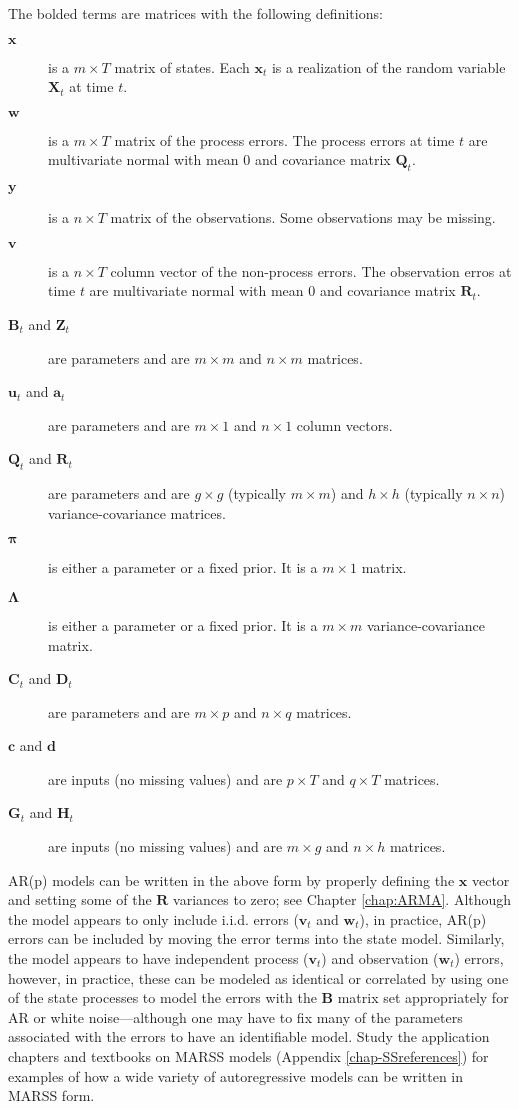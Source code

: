 \documentclass[12pt,]{book}
\begin{document}
The bolded terms are matrices with the following definitions:

\begin{description}
    \item[$\mathbf{x}$] is a $m \times T$ matrix of states.  Each $\mathbf{x}_t$ is a realization of the random variable $\mathbf{X}_t$ at time $t$.
    \item[$\mathbf{w}$] is a $m \times T$ matrix of the process errors.  The process errors at time $t$ are multivariate normal with mean 0 and covariance matrix $\mathbf{Q}_t$.
    \item[$\mathbf{y}$] is a $n \times T$ matrix of the observations.   Some observations may be missing.
    \item[$\mathbf{v}$] is a $n \times T$ column vector of the non-process errors.  The observation erros at time $t$ are multivariate normal with mean 0 and covariance matrix $\mathbf{R}_t$.
    \item[$\mathbf{B}_t$ and $\mathbf{Z}_t$] are parameters and are $m \times m$ and $n \times m$ matrices.
    \item[$\mathbf{u}_t$ and $\mathbf{a}_t$] are parameters and are $m \times 1$ and $n \times 1$ column vectors.
    \item[$\mathbf{Q}_t$ and $\mathbf{R}_t$] are parameters and are $g \times g$ (typically $m \times m$) and $h \times h$ (typically $n \times n$) variance-covariance matrices.
    \item[$\boldsymbol{\pi}$] is either a parameter or a fixed prior. It is a $m \times 1$ matrix.
    \item[$\boldsymbol{\Lambda}$] is either a parameter or a fixed prior. It is a $m \times m$ variance-covariance matrix.
    \item[$\mathbf{C}_t$ and $\mathbf{D}_t$] are parameters and are $m \times p$ and $n \times q$ matrices.
    \item[$\mathbf{c}$ and $\mathbf{d}$] are inputs (no missing values) and are $p \times T$ and $q \times T$ matrices.
  \item[$\mathbf{G}_t$ and $\mathbf{H}_t$] are inputs (no missing values) and are $m \times g$ and $n \times h$ matrices.
\end{description}

AR(p) models can be written in the above form by properly defining the \(\mathbf{x}\) vector and setting some of the \(\mathbf{R}\) variances to zero; see Chapter \ref{chap:ARMA}. Although the model appears to only include i.i.d. errors (\(\mathbf{v}_t\) and \(\mathbf{w}_t\)), in practice, AR(p) errors can be included by moving the error terms into the state model. Similarly, the model appears to have independent process (\(\mathbf{v}_t\)) and observation (\(\mathbf{w}_t\)) errors, however, in practice, these can be modeled as identical or correlated by using one of the state processes to model the errors with the \(\mathbf{B}\) matrix set appropriately for AR or white noise---although one may have to fix many of the parameters associated with the errors to have an identifiable model. Study the application chapters and textbooks on MARSS models (Appendix \ref{chap-SSreferences}) for examples of how a wide variety of autoregressive models can be written in MARSS form.
\end{document}
